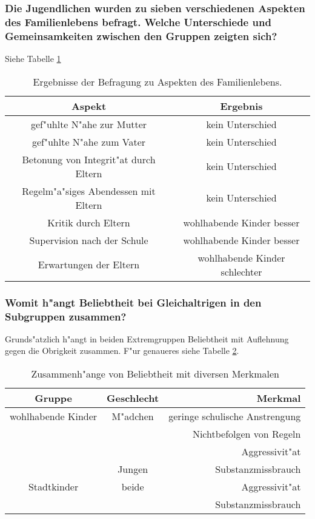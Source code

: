 \subsubsection{Die Jugendlichen wurden zu sieben verschiedenen Aspekten des Familienlebens befragt. Welche Unterschiede und Gemeinsamkeiten zwischen den Gruppen zeigten sich?}
Siehe Tabelle \ref{tab:familyaspects}
\begin{table}[hb!]
        \centering
        \begin{tabular}{c | c}
                Aspekt & Ergebnis\\
                \hline
                gef"uhlte N"ahe zur Mutter & kein Unterschied\\
                gef"uhlte N"ahe zum Vater & kein Unterschied\\
                Betonung von Integrit"at durch Eltern & kein Unterschied\\
                Regelm"a"siges Abendessen mit Eltern & kein Unterschied\\
                \hline
                Kritik durch Eltern & wohlhabende Kinder besser\\
                Supervision nach der Schule & wohlhabende Kinder besser\\
                \hline
                Erwartungen der Eltern & wohlhabende Kinder schlechter
        \end{tabular}
        \caption{Ergebnisse der Befragung zu Aspekten des Familienlebens.}
        \label{tab:familyaspects}
\end{table}

\subsubsection{Womit h"angt Beliebtheit bei Gleichaltrigen in den Subgruppen zusammen?}
Grunds"atzlich h"angt in beiden Extremgruppen Beliebtheit mit Auflehnung gegen die Obrigkeit zusammen. F"ur genaueres siehe Tabelle \ref{tab:peerstatus}.
\begin{table}
        \centering
        \begin{tabular}{c | c | r}
                Gruppe & Geschlecht & Merkmal\\
                \hline
                \hline
                wohlhabende Kinder & M"adchen & geringe schulische Anstrengung\\
                & & Nichtbefolgen von Regeln\\
                & & Aggressivit"at\\
                & Jungen & Substanzmissbrauch\\
                \hline
                Stadtkinder & beide & Aggressivit"at\\
                & & Substanzmissbrauch
        \end{tabular}
        \caption{Zusammenh"ange von Beliebtheit mit diversen Merkmalen}
        \label{tab:peerstatus}
\end{table}
